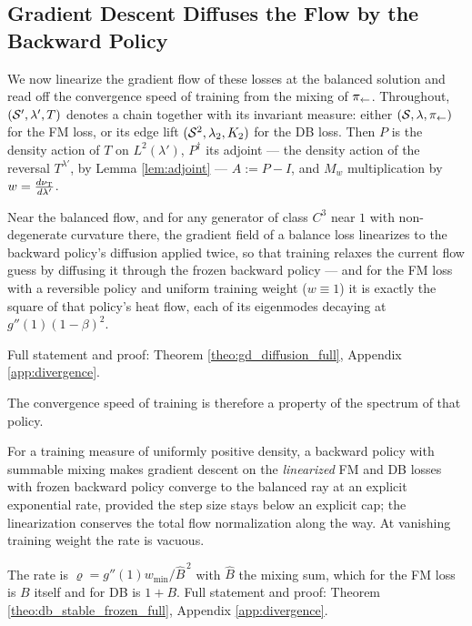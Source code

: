 \subsection{Gradient Descent Diffuses the Flow by the Backward Policy}\label{sub:gd_diffusion}

We now linearize the gradient flow of these losses at the balanced solution and read off the convergence speed of training from the mixing of $\pi_{\leftarrow}$. Throughout, $(\mathcal S',\lambda',T)$ denotes a chain together with its invariant measure: either $(\mathcal S,\lambda,\pi_{\leftarrow})$ for the FM loss, or its edge lift $(\mathcal S^2,\lambda_2,K_2)$ for the DB loss. Then $P$ is the density action of $T$ on $L^2(\lambda')$, $P^\dagger$ its adjoint --- the density action of the reversal $T^{\lambda'}$, by Lemma \ref{lem:adjoint} --- $A := P - I$, and $M_w$ multiplication by $w=\frac{d\nu_{\mathrm{T}}}{d\lambda'}$.

\begin{theorem}\label{theo:gd_diffusion}
Near the balanced flow, and for any generator of class $C^3$ near $1$ with non-degenerate curvature there, the
gradient field of a balance loss linearizes to the backward policy's diffusion applied twice, so that training relaxes the current flow guess by diffusing
it through the frozen backward policy --- and for the FM loss with a reversible policy and
uniform training weight ($w\equiv1$) it is exactly the square
of that policy's heat flow, each of its eigenmodes decaying at $g''(1)(1-\beta)^2$.
\end{theorem}
Full statement and proof: Theorem \ref{theo:gd_diffusion_full}, Appendix
\ref{app:divergence}.

The convergence speed of training is therefore a property of the spectrum of that policy.

\begin{theorem}\label{theo:db_stable_frozen}
For a training measure of uniformly positive density, a backward policy with summable
mixing makes gradient descent on the \emph{linearized} FM and DB losses with frozen backward
policy converge to the balanced ray at an explicit exponential rate, provided the step size
stays below an explicit cap; the linearization conserves the total flow normalization along
the way. At vanishing training weight the rate is vacuous.
\end{theorem}
The rate is $\varrho = g''(1)w_{\min}/\widehat B^{\,2}$ with $\widehat B$ the mixing sum,
which for the FM loss is $B$ itself and for DB is $1+B$. Full statement and proof:
Theorem \ref{theo:db_stable_frozen_full}, Appendix \ref{app:divergence}.

